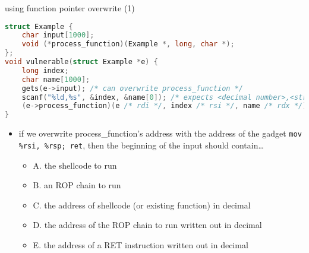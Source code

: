 \begin{frame}[fragile,label=useFPtrOverwrite1]{using function pointer overwrite (1)}
\begin{lstlisting}[language=C,style=script]
struct Example {
    char input[1000];
    void (*process_function)(Example *, long, char *);
};
void vulnerable(struct Example *e) {
    long index;
    char name[1000];
    gets(e->input); /* can overwrite process_function */
    scanf("%ld,%s", &index, &name[0]); /* expects <decimal number>,<string> */
    (e->process_function)(e /* rdi */, index /* rsi */, name /* rdx */);
}
\end{lstlisting}
\begin{itemize}
\item if we overwrite process\_function's address with the address of the gadget
    \texttt{mov \%rsi, \%rsp; ret}, then the beginning of the input
    should contain\ldots \\
    \begin{itemize}
    \item A. the shellcode to run
    \item B. an ROP chain to run
    \item C. the address of shellcode (or existing function) in decimal
    \item D. the address of the ROP chain to run written out in decimal
    \item E. the address of a RET instruction written out in decimal
    \end{itemize}
\end{itemize}
\end{frame}

